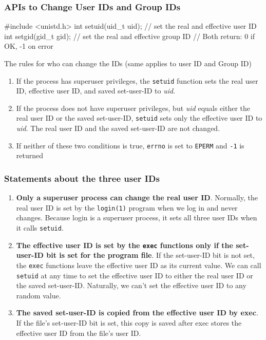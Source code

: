 \documentclass[newPxFont,sthlmFooter,nooffset]{beamer}
\begin{document}
\begin{frame}[containsverbatim,t]
  \frametitle{APIs to Change User IDs and Group IDs}

\begin{codedef}
#include <unistd.h> 
int setuid(uid_t uid);  // set the real and effective user ID
int setgid(gid_t gid);  // set the real and effective group ID
// Both return: 0 if OK, -1 on error    
\end{codedef}

The rules for who can change the IDs (same applies to user ID and Group ID)
\begin{enumerate}
\item If the process has superuser privileges, the \texttt{setuid}
  function sets the real user ID, effective user ID, and saved
  set-user-ID to \textit{uid}.
\item If the process does not have superuser privileges, but
  \textit{uid} equals either the real user ID or the saved
  set-user-ID, \texttt{setuid} sets only the effective user ID to
  \textit{uid}. The real user ID and the saved set-user-ID are not
  changed.
\item If neither of these two conditions is true, \texttt{errno} is
  set to \texttt{EPERM} and \texttt{-1} is returned
\end{enumerate}

\end{frame}

\begin{frame}[t]
  \frametitle{Statements about the three user IDs}
  \begin{enumerate}
  \item \textbf{Only a superuser process can change the real user
    ID}. Normally, the real user ID is set by the \texttt{login(1)}
    program when we log in and never changes. Because login is a
    superuser process, it sets all three user IDs when it calls
    \texttt{setuid}.
  \item \textbf{The effective user ID is set by the \texttt{exec}
      functions only if the set-user-ID bit is set for the program
      file}. If the set-user-ID bit is not set, the \texttt{exec}
    functions leave the effective user ID as its current value. We can
    call \texttt{setuid} at any time to set the effective user ID to
    either the real user ID or the saved set-user-ID. Naturally, we
    can’t set the effective user ID to any random value.
  \item \textbf{The saved set-user-ID is copied from the effective
      user ID by exec}. If the file’s set-user-ID bit is set, this
    copy is saved after exec stores the effective user ID from the
    file’s user ID.
  \end{enumerate}
\end{frame}
\end{document}
